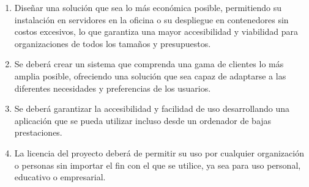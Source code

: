 \begin{enumerate}
    \item Diseñar una solución que sea lo más económica posible, permitiendo su instalación en servidores en la oficina o su despliegue en contenedores sin costos excesivos, lo que garantiza una mayor accesibilidad y viabilidad para organizaciones de todos los tamaños y presupuestos.
    \item Se deberá crear un sistema que comprenda una gama de clientes lo más amplia posible, ofreciendo una solución que sea capaz de adaptarse a las diferentes necesidades y preferencias de los usuarios.
    \item Se deberá garantizar la accesibilidad y facilidad de uso desarrollando una aplicación que se pueda utilizar incluso desde un ordenador de bajas prestaciones.
    \item La licencia del proyecto deberá de permitir su uso por cualquier organización o personas sin importar el fin con el que se utilice, ya sea para uso personal, educativo o empresarial.
\end{enumerate}